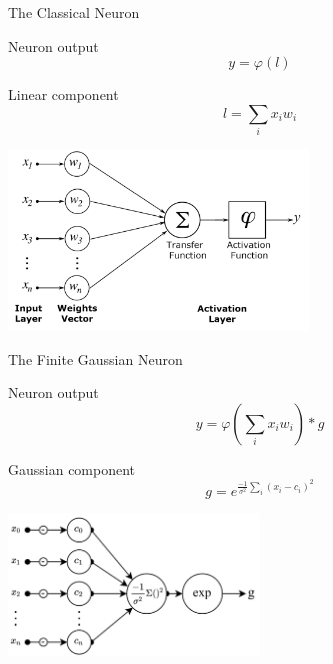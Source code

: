 \documentclass{beamer}
\begin{document}
\begin{frame}{The Classical Neuron}
    \begin{block}{Neuron output}
        $$y = \varphi(l)$$
    \end{block}
    \begin{block}{Linear component}
        $$l=\sum_i x_i w_i$$
    \end{block}
    \begin{center}
        \includegraphics[width=0.6\textwidth]{images/artificial_neuron_model.png}
    \end{center}
\end{frame}

\begin{frame}{The Finite Gaussian Neuron}
    \begin{block}{Neuron output}
        $$ y = \varphi(\sum_i x_i w_i) * g$$
    \end{block}
    \begin{block}{Gaussian component}
    $$ g = e^{\frac{-1}{\sigma^2}\sum_{i}(x_i-c_i)^2}$$
    \end{block}
    \begin{center}
        \includegraphics[width=0.5\textwidth]{images/fgn-gaussian-component.png}
    \end{center}
\end{frame}
\end{document}

